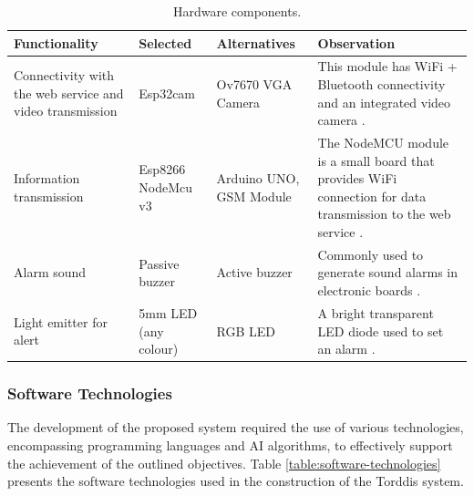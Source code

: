 \documentclass[a4paper,fleqn]{cas-sc}
\begin{document}
					\begin{table}[hbt!]
						\caption{Hardware components.}
						\label{table:hardware-components}
						\centering
						\begin{tabular}{p{}p{0.15\textwidth}p{}p{}}
							\hline
							\multicolumn{1}{l}{\textbf{Functionality}} & \multicolumn{1}{l}{\textbf{Selected}} & \multicolumn{1}{l}{\textbf{Alternatives }} & \multicolumn{1}{l}{\textbf{Observation}} \\ \hline
							Connectivity with the web service and video transmission & Esp32cam & Ov7670 VGA Camera & This module has WiFi + Bluetooth connectivity and an integrated video camera \citep{CasasSanchez2022}. \\
							Information transmission & Esp8266 NodeMcu v3 & Arduino UNO, GSM Module & The NodeMCU module is a small board that provides WiFi connection for data transmission to the web service \citep{Barai2019}. \\
							Alarm sound & Passive buzzer & Active buzzer & Commonly used to generate sound alarms in electronic boards \citep{Adebisi2023development}. \\
							Light emitter for alert & 5mm LED (any colour) & RGB LED & A bright transparent LED diode used to set an alarm \citep{Upender2020}.  \\ \hline
						\end{tabular}
					\end{table}
					
				\subsubsection*{Software Technologies}
					The development of the proposed system required the use of various technologies, encompassing programming languages and AI algorithms, to effectively support the achievement of the outlined objectives. Table \ref{table:software-technologies} presents the software technologies used in the construction of the Torddis system.
					
\end{document}
